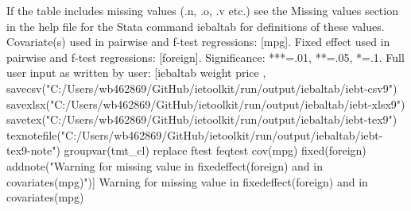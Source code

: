 If the table includes missing values (.n, .o, .v etc.) see the Missing values section in the help file for the Stata command iebaltab for definitions of these values. Covariate(s) used in pairwise and f-test regressions: [mpg]. Fixed effect used in pairwise and f-test regressions: [foreign]. Significance: ***=.01, **=.05, *=.1. Full user input as written by user: [iebaltab weight price , savecsv("C:/Users/wb462869/GitHub/ietoolkit/run/output/iebaltab/iebt-csv9") savexlsx("C:/Users/wb462869/GitHub/ietoolkit/run/output/iebaltab/iebt-xlsx9") savetex("C:/Users/wb462869/GitHub/ietoolkit/run/output/iebaltab/iebt-tex9") texnotefile("C:/Users/wb462869/GitHub/ietoolkit/run/output/iebaltab/iebt-tex9-note") groupvar(tmt\_cl) replace ftest feqtest cov(mpg) fixed(foreign) addnote("Warning for missing value in fixedeffect(foreign) and in covariates(mpg)")] Warning for missing value in fixedeffect(foreign) and in covariates(mpg)
